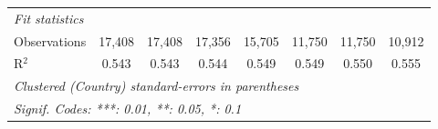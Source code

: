 \begin{tabular}{lccccccc}
   \midrule \emph{Fit statistics}\\
   Observations                                                                           & 17,408  & 17,408  & 17,356  & 15,705  & 11,750       & 11,750        & 10,912\\  
   R$^2$                                                                                  & 0.543   & 0.543   & 0.544   & 0.549   & 0.549        & 0.550         & 0.555\\  
   \midrule
   \multicolumn{8}{l}{\emph{Clustered (Country) standard-errors in parentheses}}\\
   \multicolumn{8}{l}{\emph{Signif. Codes: ***: 0.01, **: 0.05, *: 0.1}}\\
\end{tabular}
\par\endgroup


